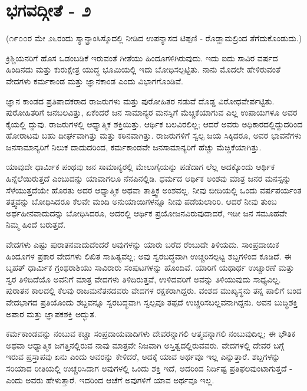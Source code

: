 
\chapter{ಭಗವದ್ಗೀತೆ - ೨}

(೧೯೦೦ರ ಮೇ ೨೬ರಂದು ಸ್ಯಾನ್ಫ್ರಾಂಸಿಸ್ಕೊದಲ್ಲಿ ನೀಡಿದ ಉಪನ್ಯಾಸದ ಟಿಪ್ಪಣಿ - ರೊಡ್ಹಾಮಲ್ರಿಂದ ತೆಗೆದುಕೊಂಡುದು.)

ಕ್ರಿಶ್ಚಿಯನರಿಗೆ ಹೊಸ ಒಡಂಬಡಿಕೆ ಇರುವಂತೆ ಗೀತೆಯು ಹಿಂದೂಗಳಿಗಿರುವುದು. ಇದು ಐದು ಸಾವಿರ ವರ್ಷದ ಹಿಂದಿನದು ಮತ್ತು ಕುರುಕ್ಷೇತ್ರ ಯುದ್ಧ ಭೂಮಿಯಲ್ಲಿ ಇದು ಬೋಧಿಸಲ್ಪಟ್ಟಿತು. ನಾನು ಮೊದಲೇ ಹೇಳಿರುವಂತೆ ವೇದಗಳು ಕರ್ಮಕಾಂಡ ಮತ್ತು ಜ್ಞಾನಕಾಂಡ ಎಂದು ವಿಭಾಗಗೊಂಡಿವೆ.

ಜ್ಞಾನ ಕಾಂಡದ ಪ್ರತಿಪಾದಕರಾದ ರಾಜರುಗಳು ಮತ್ತು ಪುರೋಹಿತರ ನಡುವೆ ದೊಡ್ಡ ವಿರೋಧವೇರ್ಪಟ್ಟಿತು. ಪುರೋಹಿತರಿಗೆ ಜನಬಲವಿತ್ತು, ಏಕೆಂದರೆ ಜನ ಸಾಮಾನ್ಯರ ಮನಸ್ಸಿಗೆ ಮೆಚ್ಚಿಕೆಯಾಗುವ ಎಲ್ಲ ಉಪಾಯಗಳೂ ಅವರ ಕೈಯಲ್ಲಿ ದ್ದುವು. ರಾಜರುಗಳಲ್ಲಿ ಆಧ್ಯಾತ್ಮಿಕ ಶಕ್ತಿಯಿತ್ತು. ಆರ್ಥಿಕ ಬಲವಿರಲಿಲ್ಲ; ಆದರೆ ಅವರು ಅಧಿಕಾರದಲ್ಲಿದ್ದುದರಿಂದ ಹೋರಾಟವು ಬಹು ದೀರ್ಘವಾಗಿತ್ತು ಮತ್ತು ಕಠಿನವಾಗಿತ್ತು. ರಾಜರುಗಳಿಗೆ ಸ್ವಲ್ಪ ಜಯ ಸಿಕ್ಕಿದರೂ, ಅವರ ಭಾವನೆಗಳು ಜನಸಾಮಾನ್ಯರಿಗೆ ನಿಲುಕ ದಾದುದರಿಂದ, ಕರ್ಮಕಾಂಡವೇ ಜನಸಾಮಾನ್ಯರಿಗೆ ಹೆಚ್ಚು ಮೆಚ್ಚಿಕೆಯಾಗಿತ್ತು.

ಯಾವುದೇ ಧಾರ್ಮಿಕ ಪಂಥವು ಜನ ಸಾಮಾನ್ಯರಲ್ಲಿ ಮೇಲುಗೈಯನ್ನು ಪಡೆದಾಗ ಲೆಲ್ಲ ಅದಕ್ಕೊಂದು ಆರ್ಥಿಕ ಹಿನ್ನೆಲೆಯಿರುತ್ತದೆ ಎಂಬುದನ್ನು ಯಾವಾಗಲೂ ನೆನಪಿನಲ್ಲಿಡಿ. ಧರ್ಮದ ಆರ್ಥಿಕ ಅಂಶವು ಮಾತ್ರ ಜನರ ಮನಸ್ಸನ್ನು ಸೆಳೆಯುತ್ತದೆಯೇ ಹೊರತು ಅದರ ಆಧ್ಯಾತ್ಮಿಕ ಅಥವಾ ತಾತ್ತ್ವಿಕ ಅಂಶವಲ್ಲ. ನೀವು ಬೀದಿಯಲ್ಲಿ ಒಂದು ವರ್ಷಪರ್ಯಂತ ತತ್ತ್ವವನ್ನು ಬೋಧಿಸಿದರೂ ಕೆಲವೇ ಮಂದಿ ಅನುಯಾಯಿಗಳನ್ನೂ ನೀವು ಪಡೆಯಲಾರಿರಿ. ಆದರೆ ನೀವು ತುಂಬ ಅರ್ಥಹೀನವಾದುದನ್ನು ಬೋಧಿಸಿದರೂ, ಅದರಲ್ಲಿ ಆರ್ಥಿಕ ಪ್ರಯೋಜನವಿರುವುದಾದರೆ, ಇಡೀ ಜನ ಸಮೂಹವೇ ನಿಮ್ಮ ಹಿಂದೆ ಬರುತ್ತದೆ.

ವೇದಗಳು ಎಷ್ಟು ಪುರಾತನವಾದುದೆಂದರೆ ಅವುಗಳನ್ನು ಯಾರು ಬರೆದ ರೆಂಬುದೇ ತಿಳಿಯದು. ಸಾಂಪ್ರದಾಯಿಕ ಹಿಂದೂಗಳ ಪ್ರಕಾರ ವೇದಗಳು ಲಿಖಿತ ಸಾಹಿತ್ಯವಲ್ಲ; ಅವು ಸ್ವರಬದ್ಧವಾಗಿ ಉಚ್ಚರಿಸಲ್ಪಟ್ಟ ಶಬ್ದಗಳಿಂದ ಕೂಡಿದೆ. ಈ ಬೃಹತ್ ಧಾರ್ಮಿಕ ಗ್ರಂಥರಾಶಿಯು ಸಾವಿರಾರು ಸಂಪುಟಗಳನ್ನು ಹೊಂದಿವೆ. ಯಾರಿಗೆ ಯಥಾರ್ಥ ಉಚ್ಚಾರಣೆ ಮತ್ತು ಸ್ವರ ತಿಳಿದಿದೆಯೊ ಅವನಿಗೆ ಮಾತ್ರ ವೇದಗಳು ತಿಳಿದಿರುತ್ತವೆ, ಉಳಿದವರಿಗೆ ಅವನ್ನು ತಿಳಿಯುವುದು ಸಾಧ್ಯವಿಲ್ಲ. ಪುರಾತನ ಕಾಲದಲ್ಲಿ ಕೆಲವು ರಾಜಮನೆತನದವರು ವೇದಗಳ ರಕ್ಷಕರಾಗಿದ್ದರು. ವಂಶದ ಮುಖ್ಯಸ್ಥನು ತನ್ನ ಪಾಲಿಗೆ ಬಂದ ವೇದಭಾಗದ ಪ್ರತಿಯೊಂದು ಶಬ್ದವನ್ನೂ ಸ್ವರಬದ್ಧವಾಗಿ ಸ್ವಲ್ಪವೂ ತಪ್ಪದೆ ಉಚ್ಚರಿಸಬಲ್ಲವನಾಗಿದ್ದನು. ಅವನ ಬುದ್ಧಿಶಕ್ತಿ ಅಪಾರ ಮತ್ತು ಜ್ಞಾಪಕಶಕ್ತಿ ಅದ್ಭುತ.

ಕರ್ಮಕಾಂಡವನ್ನು ನಂಬುವ ಕಚ್ಚಾ ಸಂಪ್ರದಾಯವಾದಿಗಳು ದೇವರನ್ನಾಗಲಿ ಆತ್ಮವನ್ನಾಗಲಿ ನಂಬುವುದಿಲ್ಲ; ಈ ಭೌತಿಕ ಅಥವಾ ಆಧ್ಯಾತ್ಮಿಕ ಜಗತ್ತಿನಲ್ಲಿರುವ ನಾವು ಮಾತ್ರವೇ ನಿಜವಾಗಿ ಅಸ್ತಿತ್ವದಲ್ಲಿರುವವರು. ವೇದಗಳಲ್ಲಿ ದೇವರ ಬಗ್ಗೆ ಇರುವ ಪ್ರಸ್ತಾಪವು ಏನು ಎಂದು ಅವರನ್ನು ಕೇಳಿದರೆ, ಅದಕ್ಕೆ ಯಾವ ಅರ್ಥವೂ ಇಲ್ಲ ಎನ್ನುತ್ತಾರೆ. ಶಬ್ದಗಳನ್ನು ಸರಿಯಾದ ರೀತಿಯಲ್ಲಿ ಉಚ್ಚರಿಸಿದಾಗ ಅವುಗಳಲ್ಲಿ ಒಂದು ಶಕ್ತಿ ಇದೆ, ಅದರಿಂದ ನಿರ್ದಿಷ್ಟ ಪ್ರತಿಫಲವುಂಟಾಗುತ್ತದೆ - ಎಂದು ಅವರು ಹೇಳುತ್ತಾರೆ. ಇದರಿಂದ ಆಚೆಗೆ ಅವುಗಳಿಗೆ ಯಾವ ಅರ್ಥವೂ ಇಲ್ಲ.

